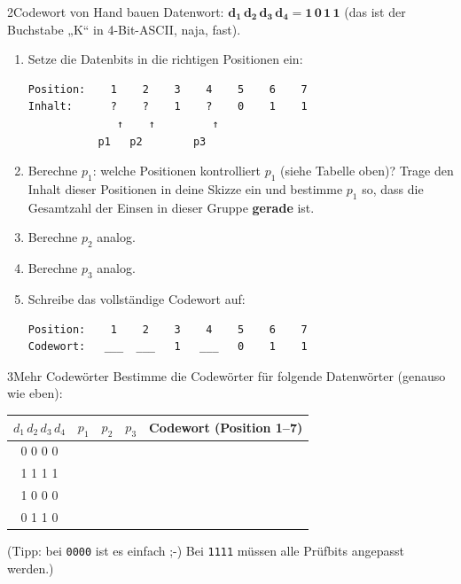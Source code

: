 \begin{bleistiftuebung}{2}{Codewort von Hand bauen}
Datenwort: $\mathbf{d_1\, d_2\, d_3\, d_4 = 1\, 0\, 1\, 1}$ (das ist
der Buchstabe „K“ in 4-Bit-ASCII, naja, fast).

\begin{enumerate}[label=(\alph*), leftmargin=*]
\item Setze die Datenbits in die richtigen Positionen ein:

  \begin{verbatim}
Position:    1    2    3    4    5    6    7
Inhalt:      ?    ?    1    ?    0    1    1
              ↑    ↑         ↑
           p1   p2        p3
  \end{verbatim}

\item Berechne $p_1$: welche Positionen kontrolliert $p_1$ (siehe
  Tabelle oben)? Trage den Inhalt dieser Positionen in deine Skizze
  ein und bestimme $p_1$ so, dass die Gesamtzahl der Einsen in dieser
  Gruppe \textbf{gerade} ist.

\item Berechne $p_2$ analog.

\item Berechne $p_3$ analog.

\item Schreibe das vollständige Codewort auf:

  \begin{verbatim}
Position:    1    2    3    4    5    6    7
Codewort:   ___  ___   1   ___   0    1    1
  \end{verbatim}
\end{enumerate}
\end{bleistiftuebung}

\begin{bleistiftuebung}{3}{Mehr Codewörter}
Bestimme die Codewörter für folgende Datenwörter (genauso wie eben):

\begin{center}
\begin{tabular}{ccccc}
  \toprule
  $d_1\, d_2\, d_3\, d_4$ & $p_1$ & $p_2$ & $p_3$ & Codewort (Position 1–7) \\
  \midrule
  0 0 0 0 & & & & \\
  1 1 1 1 & & & & \\
  1 0 0 0 & & & & \\
  0 1 1 0 & & & & \\
  \bottomrule
\end{tabular}
\end{center}

(Tipp: bei \texttt{0000} ist es einfach ;-) Bei \texttt{1111} müssen
alle Prüfbits angepasst werden.)
\end{bleistiftuebung}

